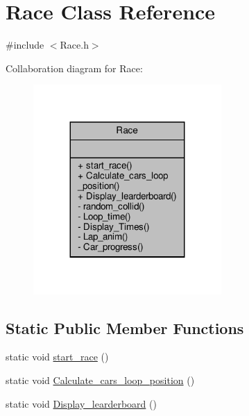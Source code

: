 \hypertarget{class_race}{}\section{Race Class Reference}
\label{class_race}


{\ttfamily \#include $<$Race.\+h$>$}



Collaboration diagram for Race\+:
\nopagebreak
\begin{figure}[H]
\begin{center}
\leavevmode
\includegraphics[width=203pt]{class_race__coll__graph}
\end{center}
\end{figure}
\subsection*{Static Public Member Functions}
\begin{DoxyCompactItemize}
\item 
static void \hyperlink{class_race_a4689c08e7e82f81bbd5f2173cf80f2e2}{start\+\_\+race} ()
\item 
static void \hyperlink{class_race_a1f46c8f5eb505d88620264f0d8f6b22c}{Calculate\+\_\+cars\+\_\+loop\+\_\+position} ()
\item 
static void \hyperlink{class_race_a60746a5c9eb52b2977a3c601a3c176d7}{Display\+\_\+learderboard} ()
\end{DoxyCompactItemize}

